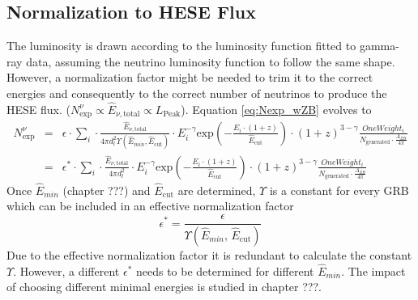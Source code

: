 \subsection{Normalization to HESE Flux}
\label{sec:norm2HESE}
The luminosity is drawn according to the luminosity function fitted to
gamma-ray data, assuming the neutrino luminosity function to follow the
same shape. However, a normalization factor might be needed to trim it to the
correct energies and consequently to the correct number of neutrinos to produce
the HESE flux. ($N_\text{exp}^\nu \propto \hat{E}_{\nu, \text{total}} \propto
L_\text{Peak}$). Equation \ref{eq:Nexp_wZB} evolves to
\begin{eqnarray}
\label{eqn:Nexp_wZB_wEps}
 N_\text{exp}^\nu &= & \epsilon \cdot \sum_i \cdot \frac{\hat{E}_{\nu,
\text{total}}}{4 \pi
d_l^2\Upsilon\left(\hat{E}_{min}, \hat{E}_\text{cut}\right)} \cdot
E_i^{-\gamma}
\text{exp} \left( - \frac{E_i \cdot (1+z)}{\hat{E}_\text{cut}} \right) \cdot
(1+z)^{3 - \gamma}
\frac{OneWeight_i}{N_\text{generated} \cdot \frac{A_{ZB}}{4 \pi}} \\
&= & \epsilon^* \cdot \sum_i \cdot \frac{\hat{E}_{\nu, \text{total}}}{4 \pi
d_l^2} \cdot
E_i^{-\gamma}
\text{exp} \left( - \frac{E_i \cdot (1+z)}{\hat{E}_\text{cut}} \right) \cdot
(1+z)^{3 - \gamma}
\frac{OneWeight_i}{N_\text{generated} \cdot \frac{A_{ZB}}{4 \pi}}
\label{eqn:Nexp_wZB_wEpsStar}
\end{eqnarray}
Once $\hat{E}_{min}$ (chapter ???) and $\hat{E}_\text{cut}$ are determined,
$\Upsilon$ is a constant for every GRB which can be included in an effective
normalization factor
\begin{equation}
\epsilon^* =
\frac{\epsilon}{\Upsilon\left(\hat{E}_{min}, \, \hat{E}_\text{cut}\right)}
\end{equation}
Due to the effective normalization factor it is redundant to calculate the
constant $\Upsilon$. However, a different $\epsilon^*$ needs to be determined
for different $\hat{E}_{min}$. The impact of choosing different minimal
energies is studied in chapter ???.


